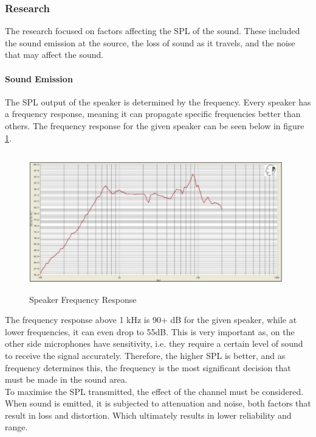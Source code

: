 \subsubsection{Research}

The research focused on factors affecting the SPL of the sound. These included the sound emission at the source, the loss of sound as it travels, and the noise that may affect the sound.

\paragraph{Sound Emission}

The SPL output of the speaker is determined by the frequency. Every speaker has a frequency response, meaning it can propagate specific frequencies better than others. The frequency response for the given speaker can be seen below in figure \ref{fig:speakerFR}. 

\begin{figure}[H]
\centering
\noindent 
\includegraphics[width=11cm,height=6cm]{./images/image3}
\caption{Speaker Frequency Response \cite{speakerDatasheet}}
\label{fig:speakerFR}
\end{figure}

The frequency response above 1 kHz is 90+ dB for the given speaker, while at lower frequencies, it can even drop to 55dB. This is very important as, on the other side microphones have sensitivity, i.e. they require a certain level of sound to receive the signal accurately. Therefore, the higher SPL is better, and as frequency determines this, the frequency is the most significant decision that must be made in the sound area. \\

To maximise the SPL transmitted, the effect of the channel must be considered. When sound is emitted, it is subjected to attenuation and noise, both factors that result in loss and distortion. Which ultimately results in lower reliability and range.

